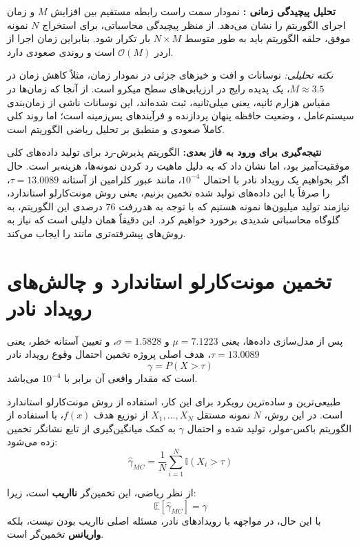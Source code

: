 \documentclass[12pt,a4paper]{article}
\begin{document}
	\textbf{تحلیل پیچیدگی زمانی :}
	نمودار سمت راست رابطه مستقیم بین افزایش $M$ و زمان اجرای الگوریتم را نشان می‌دهد. از منظر پیچیدگی محاسباتی، برای استخراج $N$ نمونه موفق، حلقه الگوریتم باید به طور متوسط $N \times M$ بار تکرار شود. بنابراین زمان اجرا از اردر $\mathcal{O}(M)$ است و روندی صعودی دارد.
	
	\textit{نکته تحلیلی:} نوسانات و افت و خیزهای جزئی در نمودار زمان، مثلاً کاهش زمان در $M \approx 3.5$، یک پدیده رایج در ارزیابی‌های سطح میکرو  است. از آنجا که زمان‌ها در مقیاس هزارم ثانیه، یعنی میلی‌ثانیه، ثبت شده‌اند، این نوسانات ناشی از زمان‌بندی سیستم‌عامل ، وضعیت حافظه پنهان پردازنده  و فرآیندهای پس‌زمینه  است؛ اما روند کلی  کاملاً صعودی و منطبق بر تحلیل ریاضی الگوریتم است.
	
	\textbf{نتیجه‌گیری برای ورود به فاز بعدی:}
	الگوریتم پذیرش-رد برای تولید داده‌های کلی موفقیت‌آمیز بود، اما نشان داد که به دلیل ماهیت رد کردن نمونه‌ها، هزینه‌بر است. حال اگر بخواهیم یک رویداد نادر با احتمال $10^{-4}$، مانند عبور کلرامین از آستانه $\tau=13.0089$، را صرفاً با این داده‌های تولید شده تخمین بزنیم، یعنی روش مونت‌کارلو استاندارد، نیازمند تولید میلیون‌ها نمونه هستیم که با توجه به هدررفت $76$ درصدی این الگوریتم، به گلوگاه محاسباتی شدیدی برخورد خواهیم کرد. این دقیقاً همان دلیلی است که نیاز به روش‌های پیشرفته‌تری مانند  را ایجاب می‌کند.
	
	\section{تخمین مونت‌کارلو استاندارد  و چالش‌های رویداد نادر}
	
	پس از مدل‌سازی داده‌ها، یعنی $\mu=7.1223$ و $\sigma=1.5828$، و تعیین آستانه خطر، یعنی $\tau=13.0089$، هدف اصلی پروژه تخمین احتمال وقوع رویداد نادر
	\[
	\gamma = P(X > \tau)
	\]
	است که مقدار واقعی آن برابر با $10^{-4}$ می‌باشد.
	
	طبیعی‌ترین و ساده‌ترین رویکرد برای این کار، استفاده از روش مونت‌کارلو استاندارد  است. در این روش، $N$ نمونه مستقل $X_1,\dots,X_N$ از توزیع هدف $f(x)$، با استفاده از الگوریتم باکس-مولر، تولید شده و احتمال $\gamma$ به کمک میانگین‌گیری از تابع نشانگر  تخمین زده می‌شود:
	\[
	\hat{\gamma}_{MC} =
	\frac{1}{N}
	\sum_{i=1}^{N}
	\mathbb{I}(X_i > \tau)
	\]
	
	از نظر ریاضی، این تخمین‌گر \textbf{نااریب } است، زیرا:
	\[
	\mathbb{E}[\hat{\gamma}_{MC}] = \gamma
	\]
	با این حال، در مواجهه با رویدادهای نادر، مسئله اصلی نااریب بودن نیست، بلکه \textbf{واریانس } تخمین‌گر است.
	
\end{document}
